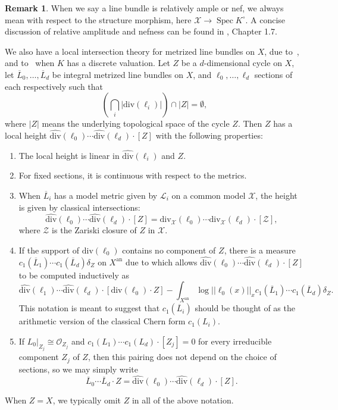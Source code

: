 \documentclass[times, doublespace]{amsart}
\numberwithin{equation}{section}
\theoremstyle{plain}
\theoremstyle{definition}
\newtheorem*{remark}{Remark}
\DeclareMathOperator{\Spec}{Spec}
\DeclareMathOperator{\an}{an}
\renewcommand{\div}{\text{div}}
\newcommand{\cO}{\mathcal{O}}
\newcommand{\cX}{\mathcal{X}}
\newcommand{\calL}{\mathcal{L}}
\begin{document}
\begin{remark}
When we say a line bundle is relatively ample or nef, we always mean with respect to the structure morphism, here $\cX\to\Spec K^{\circ}$. A concise discussion of relative amplitude and nefness can be found in \cite{lazarsfeld}, Chapter 1.7.
\end{remark}


We also have a local intersection theory for metrized line bundles on $X$, due to~\cite{G98,G07}, and to~\cite{Z95} when $K$ has a discrete valuation. Let $Z$ be a $d$-dimensional cycle on $X$, let $\overline L_0,\dots,\overline L_d$ be integral metrized line bundles on $X$, and $\ell_0,\dots,\ell_d$ sections of each respectively such that 
\[\left(\bigcap_i|\div(\ell_i)|\right)\cap|Z|=\emptyset,\]
where $|Z|$ means the underlying topological space of the cycle $Z$. Then $Z$ has a local height $\widehat{\div}(\ell_0)\cdots\widehat{\div}(\ell_d)\cdot[Z]$ with the following properties:

\begin{enumerate}
\item
The local height is linear in $\widehat{\div}(\ell_i)$ and $Z$.
\item
For fixed sections, it is continuous with respect to the metrics.
\item
When $\overline L_i$ has a model metric given by $\calL_i$ on a common model $\cX$, the height is given by classical intersections:
\[\widehat{\div}(\ell_0)\cdots\widehat{\div}(\ell_d)\cdot[Z]=\div_{\cX}(\ell_0)\cdots\div_{\cX}(\ell_d)\cdot[\mathcal Z],\]where $\mathcal Z$ is the Zariski closure of $Z$ in $\cX$.
\item
If the support of $\div(\ell_0)$ contains no component of $Z$, there is a measure $c_1(\overline L_1)\cdots c_1(\overline L_d)\delta_Z$ on $X^{\an}$ due to \cite{C-L} which allows $\widehat{\div}(\ell_0)\cdots\widehat{\div}(\ell_d)\cdot[Z]$ to be computed inductively as 
\[\widehat{\div}(\ell_1)\cdots\widehat{\div}(\ell_d)\cdot[\div(\ell_0)\cdot Z]-\int_{X^{\an}}\log ||\ell_0(x)||_xc_1(\overline L_1)\cdots c_1(\overline L_d)\delta_Z.
\]
This notation is meant to suggest that $c_1(\overline L_i)$ should be thought of as the arithmetic version of the classical Chern form $c_1(L_i)$.
\item
If $L_0|_{Z_j}\cong\cO_{Z_j}$ and $c_1(L_1)\cdots c_1(L_d)\cdot[Z_j]=0$ for every irreducible component $Z_j$ of $Z$, then this pairing does not depend on the choice of sections, so we may simply write
\[\overline L_0\cdots\overline L_d\cdot Z=\widehat{\div}(\ell_0)\cdots\widehat{\div}(\ell_d)\cdot[Z].\]
\end{enumerate}
When $Z=X$, we typically omit $Z$ in all of the above notation.
\end{document}

